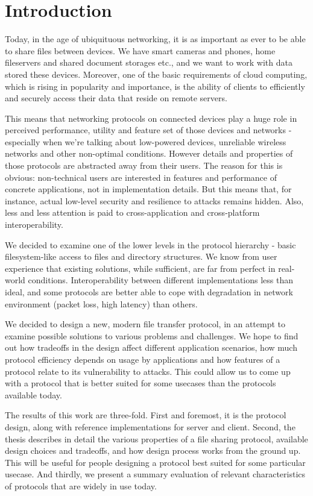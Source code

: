 \chapter*{Introduction}

Today, in the age of ubiquituous networking, it is as important as ever to be able to share files between
devices.  We have smart cameras and phones, home fileservers and shared document storages etc., and we want to
work with data stored these devices. Moreover, one of the basic requirements of cloud computing, which is
rising in popularity and importance, is the ability of clients to efficiently and securely access their data
that reside on remote servers.

This means that networking protocols on connected devices play a huge role in perceived performance, utility
and feature set of those devices and networks - especially when we're talking about low-powered devices,
unreliable wireless networks and other non-optimal conditions. However details and properties of those
protocols are abstracted away from their users. The reason for this is obvious: non-technical users are
interested in features and performance of concrete applications, not in implementation details. But this means
that, for instance, actual low-level security and resilience to attacks remains hidden. Also, less and less
attention is paid to cross-application and cross-platform interoperability.

We decided to examine one of the lower levels in the protocol hierarchy - basic filesystem-like access to
files and directory structures. We know from user experience that existing solutions, while sufficient, are
far from perfect in real-world conditions. Interoperability between different implementations less than ideal,
and some protocols are better able to cope with degradation in network environment (packet loss, high latency)
than others.

We decided to design a new, modern file transfer protocol, in an attempt to examine possible solutions to
various problems and challenges. We hope to find out how tradeoffs in the design affect different application
scenarios, how much protocol efficiency depends on usage by applications and how features of a protocol relate
to its vulnerability to attacks. This could allow us to come up with a protocol that is better suited for some
usecases than the protocols available today.

The results of this work are three-fold. First and foremost, it is the protocol design, along with reference
implementations for server and client. Second, the thesis describes in detail the various properties of a file
sharing protocol, available design choices and tradeoffs, and how design process works from the ground up.
This will be useful for people designing a protocol best suited for some particular usecase. And thirdly, we
present a summary evaluation of relevant characteristics of protocols that are widely in use today.

